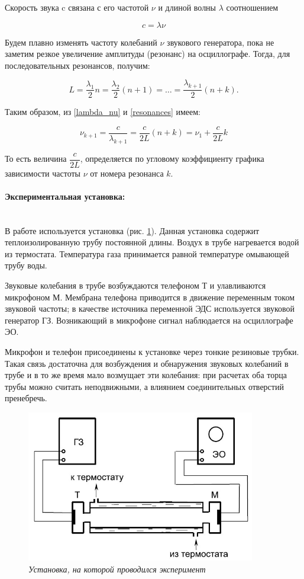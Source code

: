 \documentclass[a4paper, 12pt]{article}
\newcommand{\parag}[1]{\paragraph*{#1:}}
\begin{document}
Скорость звука c связана с его частотой $\nu$ и длиной волны $ \lambda $ соотношением
    
\begin{equation}
    \label{lambda_nu}
    c=\lambda \nu
\end{equation}
    
Будем плавно изменять частоту колебаний $\nu$ звукового генератора, пока не заметим резкое увеличение амплитуды (резонанс) на осциллографе. Тогда, для последовательных резонансов, получим:

\begin{equation}
    \label{resonances}
    L=\frac{\lambda_1}{2}n = \frac{\lambda_2}{2}(n+1) = \dots = \frac{\lambda_{k+1}}{2}(n+k).
\end{equation}

Таким образом, из \eqref{lambda_nu} и \eqref{resonances} имеем:

\begin{equation}
    \label{nu}
    \nu_{k+1} = \frac{c}{\lambda_{k+1}} = \frac{c}{2L}(n+k)= \nu_1 + \frac{c}{2L} k
\end{equation}

То есть величина $\dfrac{c}{2L}$, определяется по угловому коэффициенту графика зависимости частоты $\nu$ от номера резонанса $k$.

\parag {Экспериментальная установка} ~\\

    
В работе используется установка (рис. \ref{setup}). Данная установка содержит теплоизолированную трубу постоянной длины. Воздух в трубе нагревается водой из термостата. Температура газа принимается равной температуре омывающей трубу воды. 

Звуковые колебания в трубе возбуждаются телефоном Т и улавливаются микрофоном М. Мембрана телефона приводится в движение переменным током звуковой частоты; в качестве источника переменной ЭДС используется звуковой генератор ГЗ. Возникающий в микрофоне сигнал наблюдается на осциллографе ЭО.

Микрофон и телефон присоединены к установке через тонкие резиновые трубки. Такая связь достаточна для возбуждения и обнаружения звуковых колебаний в трубе и в то же время мало возмущает эти колебания: при расчетах оба торца трубы можно считать неподвижными, а влиянием соединительных отверстий пренебречь.

\begin{figure}[H]
    \centering
    \includegraphics[width=10cm]{setup.jpg}
    \caption{\textit{Установка, на которой проводился эксперимент}}
    \label{setup}
\end{figure}
\end{document}
